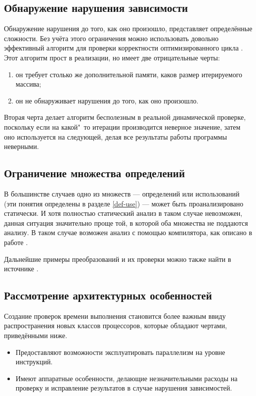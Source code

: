 \subsection{Обнаружение нарушения зависимости}

Обнаружение нарушения до того, как оно произошло, представляет определённые сложности. Без учёта этого ограничения можно использовать довольно эффективный алгоритм для проверки корректности оптимизированного цикла \cite{ZuckPFGH02}. Этот алгоритм прост в реализации, но имеет две отрицательные черты:

\begin{enumerate}
	\item он требует столько же дополнительной памяти, каков размер итерируемого массива;
	\item он не обнаруживает нарушения до того, как оно произошло.
\end{enumerate}

Вторая черта делает алгоритм бесполезным в реальной динамической проверке, поскольку если на какой"~то итерации производится неверное значение, затем оно используется на следующей, делая все результаты работы программы неверными.

\subsection{Ограничение множества определений}

В большинстве случаев одно из множеств --- определений или использований (эти понятия определены в разделе \ref{def-use}) --- может быть проанализировано статически. И хотя полностью статический анализ в таком случае невозможен, данная ситуация значительно проще той, в которой оба множества не поддаются анализу. В таком случае возможен анализ с помощью компилятора, как описано в работе \cite{ZuckPFGH02}.

Дальнейшие примеры преобразований и их проверки можно также найти в источнике \cite{ZuckPFGH02}.

\subsection{Рассмотрение архитектурных особенностей}

Создание проверок времени выполнения становится более важным ввиду распространения новых классов процессоров, которые обладают чертами, приведёнными ниже.

\begin{itemize}
	\item Предоставляют возможности эксплуатировать параллелизм на уровне инструкций.
	\item Имеют аппаратные особенности, делающие незначительными расходы на проверку и исправление результатов в случае нарушения зависимостей.
\end{itemize}

